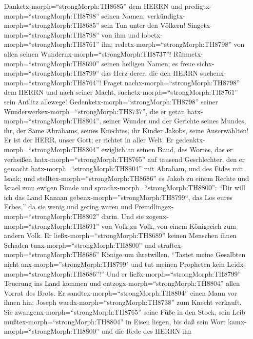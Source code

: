  Danketx-morph=``strongMorph:TH8685'' dem HERRN und
predigtx-morph=``strongMorph:TH8798'' seinen Namen;
verkündigtx-morph=``strongMorph:TH8685'' sein Tun unter den Völkern!
 Singetx-morph=``strongMorph:TH8798'' von ihm und
lobetx-morph=``strongMorph:TH8761'' ihn;
redetx-morph=``strongMorph:TH8798'' von allen seinen
Wundernx-morph=``strongMorph:TH8737''! 
Rühmetx-morph=``strongMorph:TH8690'' seinen heiligen Namen; es freue
sichx-morph=``strongMorph:TH8799'' das Herz derer, die den HERRN
suchenx-morph=``strongMorph:TH8764''!  Fraget
nachx-morph=``strongMorph:TH8798'' dem HERRN und nach seiner Macht,
suchetx-morph=``strongMorph:TH8761'' sein Antlitz allewege! 
Gedenketx-morph=``strongMorph:TH8798'' seiner
Wunderwerkex-morph=``strongMorph:TH8737'', die er getan
hatx-morph=``strongMorph:TH8804'', seiner Wunder und der Gerichte seines
Mundes,  ihr, der Same Abrahams, seines Knechtes, ihr Kinder
Jakobs, seine Auserwählten!  Er ist der HERR, unser Gott; er
richtet in aller Welt.  Er
gedenktx-morph=``strongMorph:TH8804'' ewiglich an seinen Bund, des
Wortes, das er verheißen hatx-morph=``strongMorph:TH8765'' auf tausend
Geschlechter,  den er gemacht
hatx-morph=``strongMorph:TH8804'' mit Abraham, und des Eides mit Isaak;
 und stelltex-morph=``strongMorph:TH8686'' es Jakob zu
einem Rechte und Israel zum ewigen Bunde  und
sprachx-morph=``strongMorph:TH8800'': ``Dir will ich das Land Kanaan
gebenx-morph=''strongMorph:TH8799``, das Los eures Erbes,''
 da sie wenig und gering waren und
Fremdlingex-morph=``strongMorph:TH8802'' darin.  Und sie
zogenx-morph=``strongMorph:TH8691'' von Volk zu Volk, von einem
Königreich zum andern Volk.  Er
ließx-morph=``strongMorph:TH8689'' keinen Menschen ihnen Schaden
tunx-morph=``strongMorph:TH8800'' und
straftex-morph=``strongMorph:TH8686'' Könige um ihretwillen.
 ``Tastet meine Gesalbten nicht
anx-morph=''strongMorph:TH8799" und tut meinen Propheten kein
Leidx-morph=``strongMorph:TH8686''!''  Und er
ließx-morph=``strongMorph:TH8799'' Teuerung ins Land kommen und
entzogx-morph=``strongMorph:TH8804'' allen Vorrat des Brots.
 Er sandtex-morph=``strongMorph:TH8804'' einen Mann vor
ihnen hin; Joseph wardx-morph=``strongMorph:TH8738'' zum Knecht
verkauft.  Sie zwangenx-morph=``strongMorph:TH8765'' seine
Füße in den Stock, sein Leib mußtex-morph=``strongMorph:TH8804'' in
Eisen liegen,  bis daß sein Wort
kamx-morph=``strongMorph:TH8800'' und die Rede des HERRN ihn
